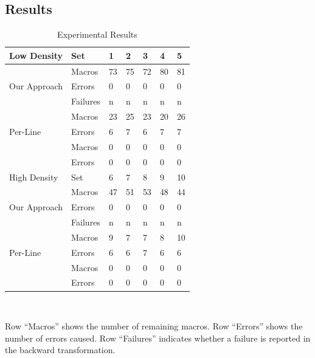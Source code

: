 \subsection{Results}
\begin{table}[htbp]
  \caption{Experimental Results}\label{tbl:results}
\centering
\begin{tabular}{|l|l|lllll|}
  \hline
  Low Density & Set & 1 & 2 & 3 & 4 & 5\\
  \hline
  \multirow{3}{*}{Our Approach} &  Macros & 73 & 75 & 72 & 80 & 81 \\
  \cline{2-7}
              &Errors & 0 & 0 & 0 & 0 & 0  \\
  \cline{2-7}
              & Failures & n & n & n & n & n \\
  \hline
  \multirow{3}{*}{Per-Line} & Macros & 23 & 25 & 23 & 20 & 26 \\
  \cline{2-7}
              & Errors & 6 & 7 & 6 & 7 & 7  \\
  \hline
  \multirow{3}{*}{Per-File} & Macros & 0 & 0 & 0 & 0 & 0  \\
  \cline{2-7}
              & Errors & 0 & 0 & 0 & 0 & 0 \\
  \hline
  \hline
  High Density & Set & 6 & 7 & 8& 9& 10\\
  \hline
  \multirow{3}{*}{Our Approach} &Macros & 47 & 51 & 53 & 48 & 44 \\
  \cline{2-7}
              &  Errors & 0 & 0 & 0 & 0 & 0  \\
  \cline{2-7}
              & Failures & n & n & n & n & n \\
  \hline
  \multirow{3}{*}{Per-Line} & Macros & 9 & 7 & 7 & 8 & 10  \\
  \cline{2-7}
              & Errors & 6 & 6 & 7 & 6 & 6 \\
  \hline
  \multirow{3}{*}{Per-File} & Macros & 0 & 0 & 0 & 0 & 0  \\
  \cline{2-7}
              & Errors & 0 & 0 & 0 & 0 & 0 \\
  \hline\end{tabular}
\\
\parbox{\columnwidth}{\footnotesize Row ``Macros'' shows the number of
    remaining macros. Row ``Errors'' shows the number of errors caused. Row ``Failures'' indicates whether a
    failure is reported in the backward transformation.}
\end{table}

